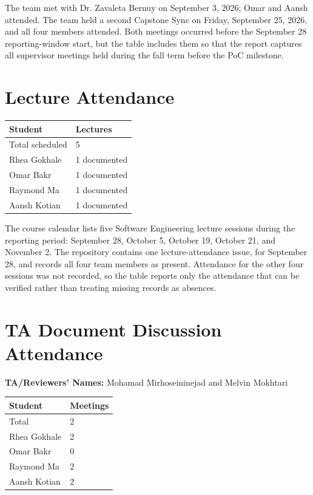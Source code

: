 \documentclass{article}
\begin{document}
The team met with Dr. Zavaleta Bernuy on September 3, 2026; Omar and Aansh
attended.  The team held a second Capstone Sync on Friday, September 25, 2026,
and all four members attended.  Both meetings occurred before the September 28
reporting-window start, but the table includes them so that the report captures
all supervisor meetings held during the fall term before the PoC milestone.

\section{Lecture Attendance}

\begin{table}[H]
\centering
\begin{tabular}{ll}
\toprule
\textbf{Student} & \textbf{Lectures}\\
\midrule
Total scheduled & 5\\
Rhea Gokhale & 1 documented\\
Omar Bakr & 1 documented\\
Raymond Ma & 1 documented\\
Aansh Kotian & 1 documented\\
\bottomrule
\end{tabular}
\end{table}

The course calendar lists five Software Engineering lecture sessions during
the reporting period: September 28, October 5, October 19, October 21, and
November 2.  The repository contains one lecture-attendance issue, for
September 28, and records all four team members as present.  Attendance for the
other four sessions was not recorded, so the table reports only the attendance
that can be verified rather than treating missing records as absences.

\section{TA Document Discussion Attendance}

\noindent \textbf{TA/Reviewers' Names: } Mohamad Mirhoseininejad and Melvin
Mokhtari

\begin{table}[H]
\centering
\begin{tabular}{ll}
\toprule
\textbf{Student} & \textbf{Meetings}\\
\midrule
Total & 2\\
Rhea Gokhale & 2\\
Omar Bakr & 0\\
Raymond Ma & 2\\
Aansh Kotian & 2\\
\bottomrule
\end{tabular}
\end{table}
\end{document}
